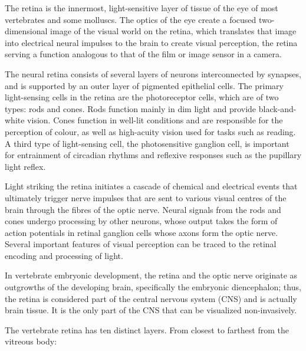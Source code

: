 The retina is the innermost, light-sensitive layer of tissue of the eye of most vertebrates and some molluscs. The optics of the eye create a focused two-dimensional image of the visual world on the retina, which translates that image into electrical neural impulses to the brain to create visual perception, the retina serving a function analogous to that of the film or image sensor in a camera.

The neural retina consists of several layers of neurons interconnected by synapses, and is supported by an outer layer of pigmented epithelial cells. The primary light-sensing cells in the retina are the photoreceptor cells, which are of two types: rods and cones. Rods function mainly in dim light and provide black-and-white vision. Cones function in well-lit conditions and are responsible for the perception of colour, as well as high-acuity vision used for tasks such as reading. A third type of light-sensing cell, the photosensitive ganglion cell, is important for entrainment of circadian rhythms and reflexive responses such as the pupillary light reflex.

Light striking the retina initiates a cascade of chemical and electrical events that ultimately trigger nerve impulses that are sent to various visual centres of the brain through the fibres of the optic nerve. Neural signals from the rods and cones undergo processing by other neurons, whose output takes the form of action potentials in retinal ganglion cells whose axons form the optic nerve. Several important features of visual perception can be traced to the retinal encoding and processing of light.

In vertebrate embryonic development, the retina and the optic nerve originate as outgrowths of the developing brain, specifically the embryonic diencephalon; thus, the retina is considered part of the central nervous system (CNS) and is actually brain tissue. It is the only part of the CNS that can be visualized non-invasively.

The vertebrate retina has ten distinct layers. From closest to farthest from the vitreous body:

